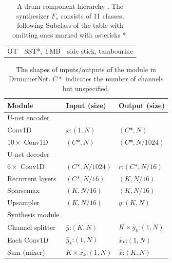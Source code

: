 \documentclass{article}
\begin{document}
\begin{table}[t]
\begin{tabular}{lll}
			\hline
			OT    &\color{gray} SST*\color{black}, TMB                                                     & \color{black} side stick, tambourine                                                           
			\color{black}
		\end{tabular}
		\caption{A drum component hierarchy \cite{southall2017mdb}. The synthesizer $F_s$ consists of 11 classes, following Subclass of the table with omitting ones marked with asterisks *.}
		\label{table:components}
	\end{table}
	\color{black}
	
	\begin{table}[t]
		\begin{tabular}{lll}
			Module                          & Input (size)                  & Output (size)                 \\ 
			\toprule
			U-net encoder                   &                               &                               \\
			\hspace{0.3cm}Conv1D            & $x$:$(1, N)$                  & $(C*, N)$                     \\
			\hspace{0.3cm}$10 \times$ Conv1D & $(C*, N)$                     & $(C*, N/1024)$                \\ 
			\hline
			U-net decoder                   &                               &                               \\
			\hspace{0.3cm}$6 \times$ Conv1D & $(C*, N/1024)$                & $r$:$(C*, N/16)$              \\ 
			\hline
			Recurrent layers                & $(C*, N/16)$                  & $(K, N/16)$                  \\ 
			\hline
			Sparsemax                       & $(K, N/16)$                  & $(K, N/16)$                   \\ 
			\hline
			Upsampler                       & $(K, N/16)$                   & $\hat{y}$:$(K, N)$            \\ 
			\hline
			Synthesis module                &                               &                               \\
			\hspace{0.3cm}Channel splitter  & $\hat{y}$:$(K, N)$            & $K \times \hat{y}_k$:$(1, N)$ \\
			\hspace{0.3cm}Each Conv1D       & $\hat{y}_k$:$(1, N)$          & $\hat{x}_k$:$(1, N)$          \\
			\hspace{0.3cm}Sum (mixer)       & $K \times \hat{x}_k$:$(1, N)$ & $\hat{x}$:$(K, N)$           
		\end{tabular}
		\caption{The shapes of inputs/outputs of the module in DrummerNet. $C*$ indicates the number of channels but unspecified.}
		\label{table:structure}
	\end{table}
	
\end{document}
